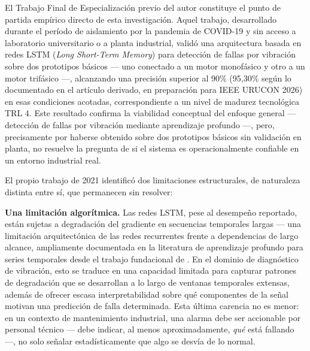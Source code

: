 \documentclass[11pt]{article}
\begin{document}
El Trabajo Final de Especialización previo del autor \citep{deleonsum2021} constituye el punto de partida empírico directo de esta investigación. Aquel trabajo, desarrollado durante el período de aislamiento por la pandemia de COVID-19 y sin acceso a laboratorio universitario o a planta industrial, validó una arquitectura basada en redes LSTM (\textit{Long Short-Term Memory}) para detección de fallas por vibración sobre dos prototipos básicos --- uno conectado a un motor monofásico y otro a un motor trifásico ---, alcanzando una precisión superior al 90\% (95,30\% según lo documentado en el artículo derivado, en preparación para IEEE URUCON 2026) en esas condiciones acotadas, correspondiente a un nivel de madurez tecnológica TRL 4. Este resultado confirma la viabilidad conceptual del enfoque general --- detección de fallas por vibración mediante aprendizaje profundo ---, pero, precisamente por haberse obtenido sobre dos prototipos básicos sin validación en planta, no resuelve la pregunta de si el sistema es operacionalmente confiable en un entorno industrial real.

El propio trabajo de 2021 identificó dos limitaciones estructurales, de naturaleza distinta entre sí, que permanecen sin resolver:

\textbf{Una limitación algorítmica.} Las redes LSTM, pese al desempeño reportado, están sujetas a degradación del gradiente en secuencias temporales largas --- una limitación arquitectónica de las redes recurrentes frente a dependencias de largo alcance, ampliamente documentada en la literatura de aprendizaje profundo para series temporales desde el trabajo fundacional de \citet{bengio1994}. En el dominio de diagnóstico de vibración, esto se traduce en una capacidad limitada para capturar patrones de degradación que se desarrollan a lo largo de ventanas temporales extensas, además de ofrecer escasa interpretabilidad sobre qué componentes de la señal motivan una predicción de falla determinada. Esta última carencia no es menor: en un contexto de mantenimiento industrial, una alarma debe ser accionable por personal técnico --- debe indicar, al menos aproximadamente, \textit{qué} está fallando ---, no solo señalar estadísticamente que algo se desvía de lo normal.
\end{document}
